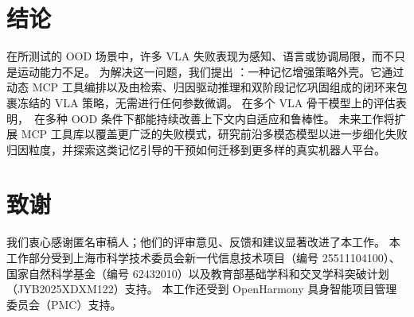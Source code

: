 \section{结论}

在所测试的 OOD 场景中，许多 VLA 失败表现为感知、语言或协调局限，而不只是运动能力不足。
为解决这一问题，我们提出 \sys：一种记忆增强策略外壳。它通过动态 MCP 工具编排以及由检索、归因驱动推理和双阶段记忆巩固组成的闭环来包裹冻结的 VLA 策略，无需进行任何参数微调。
在多个 VLA 骨干模型上的评估表明，\sys\ 在多种 OOD 条件下都能持续改善上下文内自适应和鲁棒性。
未来工作将扩展 MCP 工具库以覆盖更广泛的失败模式，研究前沿多模态模型以进一步细化失败归因粒度，并探索这类记忆引导的干预如何迁移到更多样的真实机器人平台。

\section*{致谢}

我们衷心感谢匿名审稿人；他们的评审意见、反馈和建议显著改进了本工作。
本工作部分受到上海市科学技术委员会新一代信息技术项目（编号 25511104100）、国家自然科学基金（编号 62432010）以及教育部基础学科和交叉学科突破计划（JYB2025XDXM122）支持。
本工作还受到 OpenHarmony 具身智能项目管理委员会（PMC）支持。

\endinput
